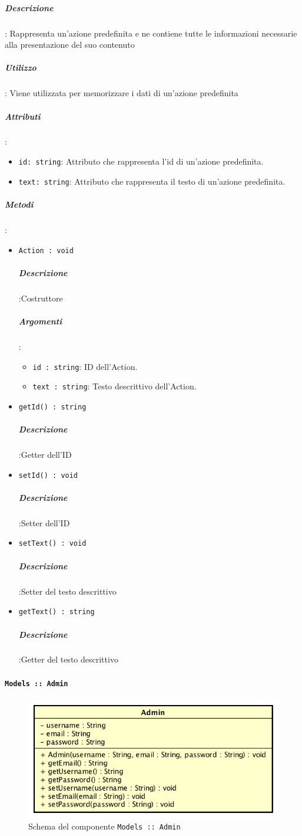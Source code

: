 \documentclass[../DefinizioneDiProdotto_v3.0.0.tex]{subfiles}
\begin{document}
		\subparagraph{Descrizione}: Rappresenta un'azione predefinita e ne contiene tutte le informazioni necessarie alla presentazione del suo contenuto
		\subparagraph{Utilizzo}: Viene utilizzata per memorizzare i dati di un'azione predefinita
		\subparagraph{Attributi}:
		      \begin{itemize}
		      	\item \texttt{id: string}:
		      	      Attributo che rappresenta l'id di un'azione predefinita.
		      	\item \texttt{text: string}:
		      	      Attributo che rappresenta il testo di un'azione predefinita.
		      \end{itemize}
		\subparagraph{Metodi}:
		      \begin{itemize}
		      	\item \texttt{Action : void}
		      	      \subparagraph{Descrizione}:Costruttore
					\subparagraph{Argomenti}:
						\begin{itemize}
							\item \texttt{id : string}:
								ID dell'Action.
							\item \texttt{text : string}:
								Testo descrittivo dell'Action.
						\end{itemize}

		      	\item \texttt{getId() : string}
		      	      \subparagraph{Descrizione}:Getter dell'ID

		      	\item \texttt{setId() : void}
		      	      \subparagraph{Descrizione}:Setter dell'ID

		      	\item \texttt{setText() : void}
		      	      \subparagraph{Descrizione}:Setter del testo descrittivo

		      	\item \texttt{getText() : string}
		      	      \subparagraph{Descrizione}:Getter del testo descrittivo
		      \end{itemize}



	\newpage
	\paragraph{\texttt{Models :: Admin}}
	\acapo
	\begin{figure}[!h]
		\centering
		\includegraphics[scale=0.7]{Architettura/Front-End/Models/Admin.png}
		\caption{Schema del componente \texttt{Models :: Admin}}
	\end{figure}
\end{document}
